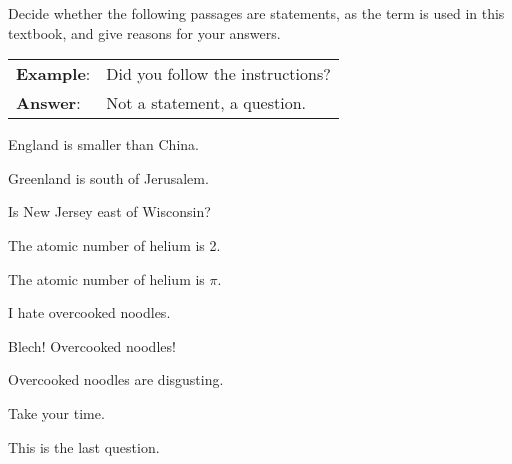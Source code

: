 \noindent\problempart Decide whether the following passages are statements, as the term is used in this textbook, and give reasons for your answers.

\begin{longtabu}{p{.1\linewidth}p{.9\linewidth}}
\textbf{Example}: & Did you follow the instructions? \\
\textbf{Answer}: & Not a statement, a question. \\
\end{longtabu}


\begin{exercises}
\item England is smaller than China. 
\item Greenland is south of Jerusalem. 
\item Is New Jersey east of Wisconsin? 
\item The atomic number of helium is 2. 
\item The atomic number of helium is $\pi$. 
\item I hate overcooked noodles. 
\item Blech! Overcooked noodles! 
\item Overcooked noodles are disgusting.
\item Take your time. 
\item This is the last question. 
\end{exercises}


